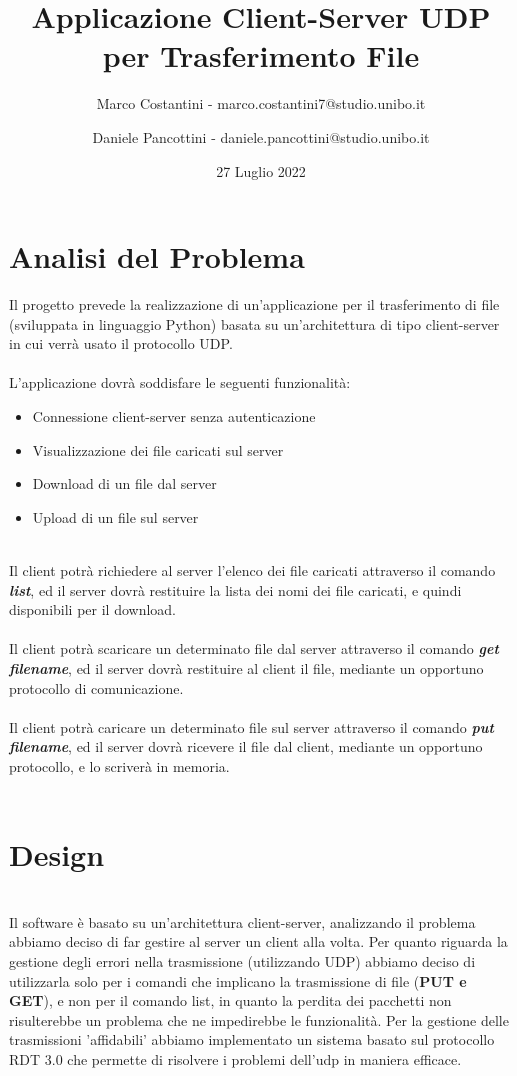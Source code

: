 \documentclass{article}
\title{Applicazione Client-Server UDP per Trasferimento File}
\author{Marco Costantini - marco.costantini7@studio.unibo.it \and Daniele Pancottini - daniele.pancottini@studio.unibo.it}
\date{27 Luglio 2022}
\begin{document}
\maketitle
\newpage

\tableofcontents

\newpage
\section{Analisi del Problema}


Il progetto prevede la realizzazione di un'applicazione per il trasferimento di file (sviluppata in linguaggio Python) basata su un'architettura di tipo client-server in cui verrà usato il protocollo UDP.\\\\
L'applicazione dovrà soddisfare le seguenti funzionalità:

	\begin{itemize}
		\item Connessione client-server senza autenticazione
		\item Visualizzazione dei file caricati sul server
		\item Download di un file dal server
		\item Upload di un file sul server
	\end{itemize}
\ \\
Il client potrà richiedere al server l'elenco dei file caricati attraverso il comando \textbf{\emph{list}}, ed il server dovrà restituire la lista dei nomi dei file caricati, e quindi disponibili per il download.\\\\
Il client potrà scaricare un determinato file dal server attraverso il comando \textbf{\emph{get filename}}, ed il server dovrà restituire al client il file, mediante un opportuno protocollo di comunicazione.\\\\
Il client potrà caricare un determinato file sul server attraverso il comando \textbf{\emph{put filename}}, ed il server dovrà ricevere il file dal client, mediante un opportuno protocollo, e lo scriverà in memoria.\\\\

\newpage
\section{Design}
\ \\
Il software è basato su un'architettura client-server, analizzando il problema abbiamo deciso di far gestire al server un client alla volta.
Per quanto riguarda la gestione degli errori nella trasmissione (utilizzando UDP) abbiamo deciso di utilizzarla solo per i comandi che implicano la trasmissione di file (\textbf{PUT e GET}), e non per il comando list, in quanto la perdita dei pacchetti non risulterebbe un problema che ne impedirebbe le funzionalità.
Per la gestione delle trasmissioni 'affidabili' abbiamo implementato un sistema basato sul protocollo RDT 3.0 che permette di risolvere i problemi dell'udp in maniera efficace.
\end{document}
